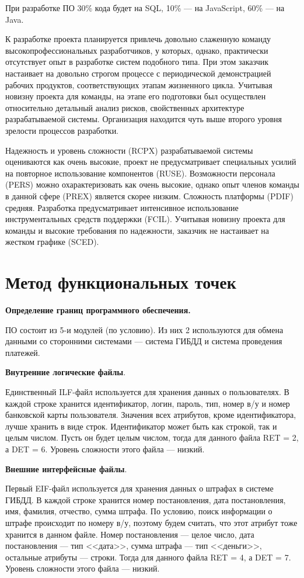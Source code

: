 \documentclass{bmstu}
\begin{document}
При разработке ПО 30\% кода будет на SQL, 10\% --- на JavaScript, 60\% --- на Java.

К разработке проекта планируется привлечь довольно слаженную команду высокопрофессиональных разработчиков, у которых, однако, практически отсутствует опыт в разработке систем подобного типа. 
При этом заказчик настаивает на довольно строгом процессе с периодической демонстрацией рабочих продуктов, соответствующих этапам жизненного цикла. 
Учитывая новизну проекта для команды, на этапе его подготовки был осуществлен относительно детальный анализ рисков, свойственных архитектуре разрабатываемой системы. 
Организация находится чуть выше второго уровня зрелости процессов разработки.

Надежность и уровень сложности (RCPX) разрабатываемой системы оцениваются как очень высокие, проект не предусматривает специальных усилий на повторное использование компонентов (RUSE). 
Возможности персонала (PERS) можно охарактеризовать как очень высокие, однако опыт членов команды в данной сфере (PREX) является скорее низким. 
Сложность платформы (PDIF) средняя. 
Разработка предусматривает интенсивное использование инструментальных средств поддержки (FCIL). 
Учитывая новизну проекта для команды и высокие требования по надежности, заказчик не настаивает на жестком графике (SCED).

\section{Метод функциональных точек}

\textbf{Определение границ программного обеспечения.}

ПО состоит из 5-и модулей (по условию). 
Из них 2 используются для обмена данными со сторонними системами --- система ГИБДД и система проведения платежей.

\textbf{Внутренние логические файлы}.

Единственный ILF-файл используется для хранения данных о пользователях. 
В каждой строке хранится идентификатор, логин, пароль, тип, номер в/у и номер банковской карты пользователя. 
Значения всех атрибутов, кроме идентификатора, лучше хранить в виде строк. 
Идентификатор может быть как строкой, так и целым числом. 
Пусть он будет целым числом, тогда для данного файла RET = 2, а DET = 6. 
Уровень сложности этого файла --- низкий.

\textbf{Внешние интерфейсные файлы}.

Первый EIF-файл используется для хранения данных о штрафах в системе ГИБДД. 
В каждой строке хранится номер постановления, дата постановления, имя, фамилия, отчество, сумма штрафа. 
По условию, поиск информации о штрафе происходит по номеру в/у, поэтому будем считать, что этот атрибут тоже хранится в данном файле. 
Номер постановления --- целое число, дата постановления --- тип <<дата>>, сумма штрафа --- тип <<деньги>>, остальные атрибуты --- строки. 
Тогда для данного файла RET = 4, а DET = 7. 
Уровень сложности этого файла --- низкий.
\end{document}
